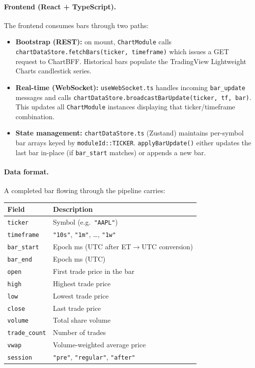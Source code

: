 \documentclass[a4paper, 11pt]{article}
\begin{document}
\paragraph{Frontend (React + TypeScript).}
The frontend consumes bars through two paths:

\begin{itemize}[nosep]
    \item \textbf{Bootstrap (REST):} on mount, \texttt{ChartModule} calls
          \texttt{chartDataStore.fetchBars(ticker, timeframe)} which issues
          a GET request to ChartBFF.  Historical bars populate the
          TradingView Lightweight Charts candlestick series.
    \item \textbf{Real-time (WebSocket):} \texttt{useWebSocket.ts} handles
          incoming \texttt{bar\_update} messages and calls
          \texttt{chartDataStore.broadcastBarUpdate(ticker, tf, bar)}.
          This updates all \texttt{ChartModule} instances displaying that
          ticker/timeframe combination.
    \item \textbf{State management:} \texttt{chartDataStore.ts} (Zustand)
          maintains per-symbol bar arrays keyed by
          \texttt{moduleId::TICKER}.  \texttt{applyBarUpdate()} either
          updates the last bar in-place (if \texttt{bar\_start} matches)
          or appends a new bar.
\end{itemize}

\paragraph{Data format.}
A completed bar flowing through the pipeline carries:

\begin{center}
\footnotesize
\begin{tabular}{ll}
    \textbf{Field} & \textbf{Description} \\
    \hline
    \texttt{ticker}       & Symbol (e.g.\ \texttt{"AAPL"}) \\
    \texttt{timeframe}    & \texttt{"10s"}, \texttt{"1m"}, \ldots, \texttt{"1w"} \\
    \texttt{bar\_start}   & Epoch ms (UTC after ET$\to$UTC conversion) \\
    \texttt{bar\_end}     & Epoch ms (UTC) \\
    \texttt{open}         & First trade price in the bar \\
    \texttt{high}         & Highest trade price \\
    \texttt{low}          & Lowest trade price \\
    \texttt{close}        & Last trade price \\
    \texttt{volume}       & Total share volume \\
    \texttt{trade\_count} & Number of trades \\
    \texttt{vwap}         & Volume-weighted average price \\
    \texttt{session}      & \texttt{"pre"}, \texttt{"regular"}, \texttt{"after"} \\
\end{tabular}
\end{center}
\end{document}
